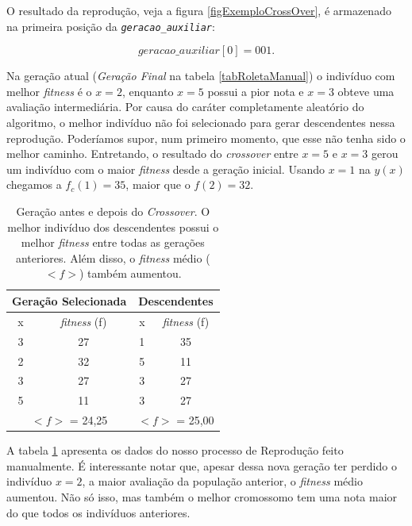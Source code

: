 	O resultado da reprodução, veja a figura \ref{figExemploCrossOver}, é armazenado na primeira posição da \textit{\texttt{geracao\_auxiliar}}:
	
	$$
		geracao\_auxiliar[0] = 001.
	$$
	
	Na geração atual (\textit{Geração Final} na tabela \ref{tabRoletaManual}) o indivíduo com melhor \textit{fitness} é o $x = 2$, enquanto $x = 5$ possui a pior nota e $x = 3$ obteve uma avaliação intermediária. Por causa do caráter completamente aleatório do algoritmo, o melhor indivíduo não foi selecionado para gerar descendentes nessa reprodução. Poderíamos supor, num primeiro momento, que esse não tenha sido o melhor caminho. Entretando, o resultado do \textit{crossover} entre $x = 5$ e $x = 3$ gerou um indivíduo com o maior \textit{fitness} desde a geração inicial. Usando $x = 1$ na $y(x)$ chegamos a $f_c(1) = 35$, maior que o $f(2) = 32$.
	
\begin{table}[htp]
	\caption{\label{tabCrossoverManual}Geração antes e depois do \textit{Crossover}. O melhor indivíduo dos descendentes possui o melhor \textit{fitness} entre todas as gerações anteriores. Além disso, o \textit{fitness} médio ($<f>$) também aumentou.}
	\begin{center}
		\begin{tabular}{c|c|c|c}
			\hline
			\multicolumn{2}{c|}{\textbf{Geração Selecionada}} &  \multicolumn{2}{c}{\textbf{Descendentes}}  \\
			\hline
			x 					& \textit{fitness} (f)	& x						& \textit{fitness} (f)	\\
			\hline
			3 					& 27										& 1						&	35 \\
			2 					& 32 										& 5						&	11 \\
			3 					& 27										& 3						&	27 \\	
			5 					& 11										& 3						&	27\\
			\hline
			\multicolumn{2}{c|}{$<f>$ = 24,25} & \multicolumn{2}{c}{$<f>$ = 25,00}  \\
			\hline
		\end{tabular}
	\end{center}
\end{table}
	
	A tabela \ref{tabCrossoverManual} apresenta os dados do nosso processo de Reprodução feito manualmente. É interessante notar que, apesar dessa nova geração ter perdido o indivíduo $x = 2$, a maior avaliação da população anterior, o \textit{fitness} médio aumentou. Não só isso, mas também o melhor cromossomo tem uma nota maior do que todos os indivíduos anteriores. 
	
